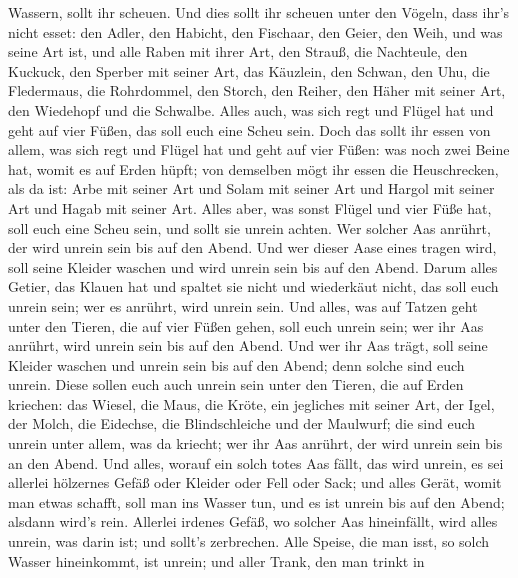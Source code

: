 Wassern, sollt ihr scheuen.  Und dies sollt ihr scheuen
unter den Vögeln, dass ihr's nicht esset: den Adler, den Habicht, den
Fischaar,  den Geier, den Weih, und was seine Art ist,
 und alle Raben mit ihrer Art,  den Strauß,
die Nachteule, den Kuckuck, den Sperber mit seiner Art, 
das Käuzlein, den Schwan, den Uhu,  die Fledermaus, die
Rohrdommel,  den Storch, den Reiher, den Häher mit seiner
Art, den Wiedehopf und die Schwalbe.  Alles auch, was sich
regt und Flügel hat und geht auf vier Füßen, das soll euch eine Scheu
sein.  Doch das sollt ihr essen von allem, was sich regt
und Flügel hat und geht auf vier Füßen: was noch zwei Beine hat, womit
es auf Erden hüpft;  von demselben mögt ihr essen die
Heuschrecken, als da ist: Arbe mit seiner Art und Solam mit seiner Art
und Hargol mit seiner Art und Hagab mit seiner Art.  Alles
aber, was sonst Flügel und vier Füße hat, soll euch eine Scheu sein,
 und sollt sie unrein achten. Wer solcher Aas anrührt, der
wird unrein sein bis auf den Abend.  Und wer dieser Aase
eines tragen wird, soll seine Kleider waschen und wird unrein sein bis
auf den Abend.  Darum alles Getier, das Klauen hat und
spaltet sie nicht und wiederkäut nicht, das soll euch unrein sein; wer
es anrührt, wird unrein sein.  Und alles, was auf Tatzen
geht unter den Tieren, die auf vier Füßen gehen, soll euch unrein sein;
wer ihr Aas anrührt, wird unrein sein bis auf den Abend. 
Und wer ihr Aas trägt, soll seine Kleider waschen und unrein sein bis
auf den Abend; denn solche sind euch unrein.  Diese sollen
euch auch unrein sein unter den Tieren, die auf Erden kriechen: das
Wiesel, die Maus, die Kröte, ein jegliches mit seiner Art, 
der Igel, der Molch, die Eidechse, die Blindschleiche und der Maulwurf;
 die sind euch unrein unter allem, was da kriecht; wer ihr
Aas anrührt, der wird unrein sein bis an den Abend.  Und
alles, worauf ein solch totes Aas fällt, das wird unrein, es sei
allerlei hölzernes Gefäß oder Kleider oder Fell oder Sack; und alles
Gerät, womit man etwas schafft, soll man ins Wasser tun, und es ist
unrein bis auf den Abend; alsdann wird's rein.  Allerlei
irdenes Gefäß, wo solcher Aas hineinfällt, wird alles unrein, was darin
ist; und sollt's zerbrechen.  Alle Speise, die man isst, so
solch Wasser hineinkommt, ist unrein; und aller Trank, den man trinkt in

